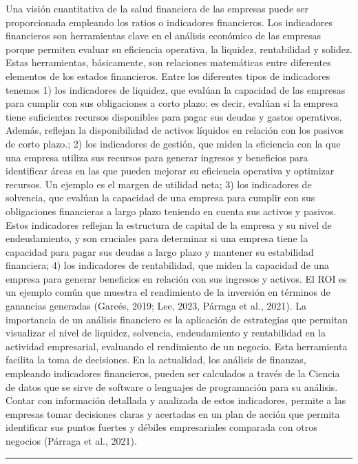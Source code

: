 \documentclass[
]{article}
\begin{document}
Una visión cuantitativa de la salud financiera de las empresas puede ser
proporcionada empleando los ratios o indicadores financieros. Los
indicadores financieros son herramientas clave en el análisis económico
de las empresas porque permiten evaluar su eficiencia operativa, la
liquidez, rentabilidad y solidez. Estas herramientas, básicamente, son
relaciones matemáticas entre diferentes elementos de los estados
financieros. Entre los diferentes tipos de indicadores tenemos 1) los
indicadores de liquidez, que evalúan la capacidad de las empresas para
cumplir con sus obligaciones a corto plazo: es decir, evalúan si la
empresa tiene suficientes recursos disponibles para pagar sus deudas y
gastos operativos. Además, reflejan la disponibilidad de activos
líquidos en relación con los pasivos de corto plazo.; 2) los indicadores
de gestión, que miden la eficiencia con la que una empresa utiliza sus
recursos para generar ingresos y beneficios para identificar áreas en
las que pueden mejorar su eficiencia operativa y optimizar recursos. Un
ejemplo es el margen de utilidad neta; 3) los indicadores de solvencia,
que evalúan la capacidad de una empresa para cumplir con sus
obligaciones financieras a largo plazo teniendo en cuenta sus activos y
pasivos. Estos indicadores reflejan la estructura de capital de la
empresa y su nivel de endeudamiento, y son cruciales para determinar si
una empresa tiene la capacidad para pagar sus deudas a largo plazo y
mantener su estabilidad financiera; 4) los indicadores de rentabilidad,
que miden la capacidad de una empresa para generar beneficios en
relación con sus ingresos y activos. El ROI es un ejemplo común que
muestra el rendimiento de la inversión en términos de ganancias
generadas (Garcés, 2019; Lee, 2023, Párraga et al., 2021). La
importancia de un análisis financiero es la aplicación de estrategias
que permitan visualizar el nivel de liquidez, solvencia, endeudamiento y
rentabilidad en la actividad empresarial, evaluando el rendimiento de un
negocio. Esta herramienta facilita la toma de decisiones. En la
actualidad, los análisis de finanzas, empleando indicadores financieros,
pueden ser calculados a través de la Ciencia de datos que se sirve de
software o lenguajes de programación para su análisis. Contar con
información detallada y analizada de estos indicadores, permite a las
empresas tomar decisiones claras y acertadas en un plan de acción que
permita identificar sus puntos fuertes y débiles empresariales comparada
con otros negocios (Párraga et al., 2021).

\begin{center}\rule{0.5\linewidth}{0.5pt}\end{center}
\end{document}
